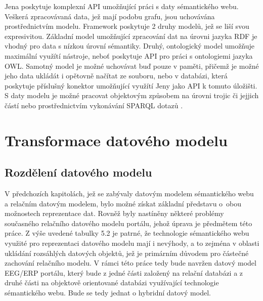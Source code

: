 \documentclass{projekt}
\begin{document}
Jena poskytuje komplexní API umožňující práci s daty sémantického webu. Veškerá zpracovávaná data, jež mají podobu grafu, jsou uchovávána prostřednictvím modelu. Framework poskytuje 2 druhy modelů, jež se liší svou expresivitou. Základní model umožňující zpracování dat na úrovni jazyka RDF je vhodný pro data s nízkou úrovní sémantiky. Druhý, ontologický model umožňuje maximální využítí nástroje, neboť poskytuje API pro práci s ontologiemi jazyka OWL. Samotný model je možné uchovávat buď pouze v paměti, přičemž je možné jeho data ukládát i opětovně načítat ze souboru, nebo v databázi, která poskytuje příslušný konektor umožňující využítí Jeny jako API k tomuto úložišti. S daty modelu je možné pracovat objektovým způsobem na úrovni trojic či jejjich částí nebo prostřednictvím vykonávání SPARQL dotazů \cite{_28}.




\chapter{Transformace datového modelu}
\section{Rozdělení datového modelu}
\hspace{0.65cm}V předchozích kapitolách, jež se zabývaly datovým modelem sémantického webu a relačním datovým modelem, bylo možné získat základní představu o~obou možnostech reprezentace dat. Rovněž byly nastíněny některé problémy současného relačního datového modelu portálu, jehož úprava je předmětem této práce. Z výše uvedené tabulky 5.2 je patrné, že technologie sémantického webu využité pro reprezentaci datového modelu mají i nevýhody, a to zejména v oblasti ukládání rozsáhlých datových objektů, jež je primárním důvodem pro částečné zachování relačního modelu. V rámci této práce tedy bude navržen datový model EEG/ERP portálu, který bude z jedné části  založený na relační databázi a z druhé části na objektově orientované databázi využívající technologie sémantického webu. Bude se tedy jednat o hybridní datový model.
\end{document}
